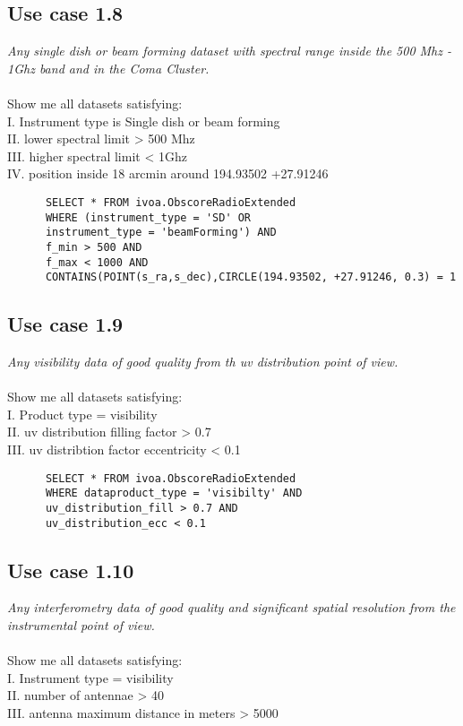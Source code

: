 \documentclass[11pt,a4paper]{ivoa}
\begin{document}
\subsection{Use case 1.8}
\textit{Any single dish or beam forming dataset  with spectral range inside the 500 Mhz - 1Ghz band and in the Coma Cluster.}\\ \\
Show me all datasets satisfying:\\
I. Instrument type is Single dish or beam forming \\
II. lower spectral limit > 500 Mhz \\
III. higher spectral limit < 1Ghz \\
IV. position inside 18 arcmin around 194.93502 +27.91246
\begin{verbatim}
      SELECT * FROM ivoa.ObscoreRadioExtended
      WHERE (instrument_type = 'SD' OR
      instrument_type = 'beamForming') AND
      f_min > 500 AND
      f_max < 1000 AND
      CONTAINS(POINT(s_ra,s_dec),CIRCLE(194.93502, +27.91246, 0.3) = 1     
\end{verbatim}


\subsection{Use case 1.9}
\textit{Any visibility data of good quality from th uv distribution point of view.}\\ \\
Show me all datasets satisfying:\\
I. Product type = visibility \\
II. uv distribution filling factor  > 0.7 \\
III. uv distribtion factor eccentricity  < 0.1 \\

\begin{verbatim}
      SELECT * FROM ivoa.ObscoreRadioExtended
      WHERE dataproduct_type = 'visibilty' AND
      uv_distribution_fill > 0.7 AND
      uv_distribution_ecc < 0.1  
\end{verbatim}


\subsection{Use case 1.10}
\textit{Any interferometry data of good quality and significant spatial resolution from the instrumental point of view. }\\ \\
Show me all datasets satisfying:\\
I. Instrument type = visibility \\
II. number of antennae > 40 \\
III. antenna maximum distance in meters  > 5000 \\
\end{document}
